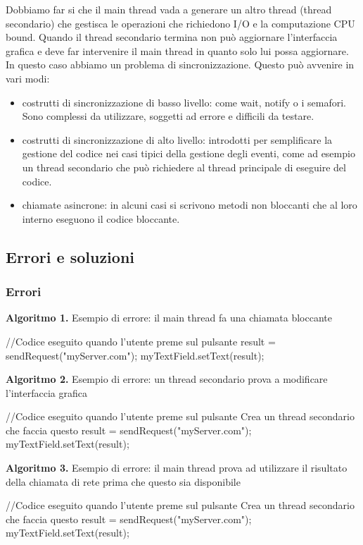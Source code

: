 Dobbiamo far si che il main thread vada a generare un altro thread (thread secondario) che gestisca le operazioni che richiedono I/O e la computazione CPU bound. 
Quando il thread secondario termina non può aggiornare l'interfaccia grafica e deve far intervenire il main thread in quanto solo lui possa aggiornare. 
In questo caso abbiamo un problema di sincronizzazione. 
Questo può avvenire in vari modi:
\begin{itemize}
    \item costrutti di sincronizzazione di basso livello: come wait, notify o i semafori. Sono complessi da utilizzare, soggetti ad errore e difficili da testare.
    \item costrutti di sincronizzazione di alto livello: introdotti per semplificare la gestione del codice nei casi tipici della gestione degli eventi, come ad esempio un thread secondario che può richiedere al thread principale di eseguire del codice.

    \item chiamate asincrone: in alcuni casi si scrivono metodi non bloccanti che al loro interno eseguono il codice bloccante. 
    
\end{itemize}

\subsection{Errori e soluzioni}
\subsubsection{Errori}
\textbf{Algoritmo 1. }Esempio di errore: il main thread fa una chiamata bloccante
\begin{Java}
    //Codice eseguito quando l'utente preme sul pulsante
    result = sendRequest("myServer.com");
    myTextField.setText(result);
\end{Java}
\textbf{Algoritmo 2. }Esempio di errore: un thread secondario prova a modificare l’interfaccia grafica
\begin{Java}
    //Codice eseguito quando l'utente preme sul pulsante
    Crea un thread secondario che faccia questo {
        result = sendRequest("myServer.com");
        myTextField.setText(result);
    }
\end{Java}

\textbf{Algoritmo 3. }Esempio di errore: il main thread prova ad utilizzare il risultato della chiamata di rete prima che questo sia disponibile
\begin{Java}
    //Codice eseguito quando l'utente preme sul pulsante
    Crea un thread secondario che faccia questo {
        result = sendRequest("myServer.com");
    }
    myTextField.setText(result);
\end{Java}
